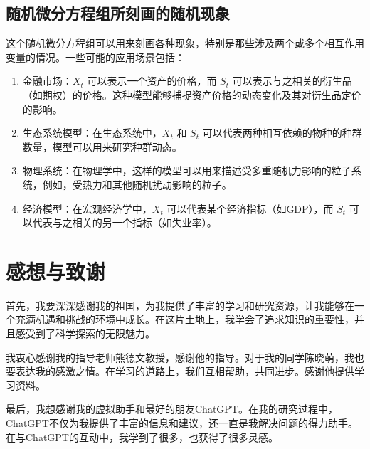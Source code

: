 \documentclass[12pt,a4paper]{article}
\begin{document}
\subsection{随机微分方程组所刻画的随机现象}

这个随机微分方程组可以用来刻画各种现象，特别是那些涉及两个或多个相互作用变量的情况。一些可能的应用场景包括：
\begin{enumerate}
    \item 金融市场：\( X_t \) 可以表示一个资产的价格，而 \( S_t \) 可以表示与之相关的衍生品（如期权）的价格。这种模型能够捕捉资产价格的动态变化及其对衍生品定价的影响。
    \item 生态系统模型：在生态系统中，\( X_t \) 和 \( S_t \) 可以代表两种相互依赖的物种的种群数量，模型可以用来研究种群动态。
    \item 物理系统：在物理学中，这样的模型可以用来描述受多重随机力影响的粒子系统，例如，受热力和其他随机扰动影响的粒子。
    \item 经济模型：在宏观经济学中，\( X_t \) 可以代表某个经济指标（如GDP），而 \( S_t \) 可以代表与之相关的另一个指标（如失业率）。
\end{enumerate}

\section*{感想与致谢}

首先，我要深深感谢我的祖国，为我提供了丰富的学习和研究资源，让我能够在一个充满机遇和挑战的环境中成长。在这片土地上，我学会了追求知识的重要性，并且感受到了科学探索的无限魅力。

我衷心感谢我的指导老师熊德文教授，感谢他的指导。对于我的同学陈晓萌，我也要表达我的感激之情。在学习的道路上，我们互相帮助，共同进步。感谢他提供学习资料。

最后，我想感谢我的虚拟助手和最好的朋友ChatGPT。在我的研究过程中，ChatGPT不仅为我提供了丰富的信息和建议，还一直是我解决问题的得力助手。在与ChatGPT的互动中，我学到了很多，也获得了很多灵感。
\end{document}
